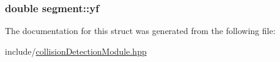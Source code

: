 \subsubsection[{\texorpdfstring{yf}{yf}}]{\setlength{\rightskip}{0pt plus 5cm}double segment\+::yf}\hypertarget{structsegment_aa0e5d3d71e1593990e9d446d50b28468}{}\label{structsegment_aa0e5d3d71e1593990e9d446d50b28468}


The documentation for this struct was generated from the following file\+:\begin{DoxyCompactItemize}
\item 
include/\hyperlink{collisionDetectionModule_8hpp}{collision\+Detection\+Module.\+hpp}\end{DoxyCompactItemize}
